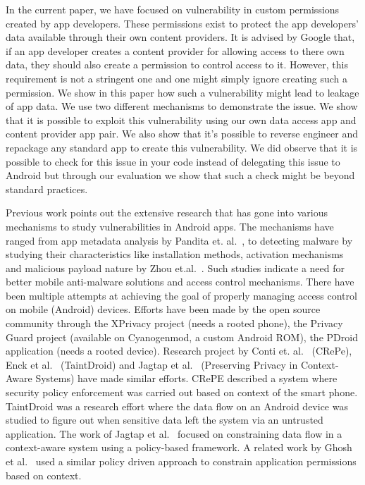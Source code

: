 In the current paper, we have focused on vulnerability in custom permissions created by app developers. These permissions exist to protect the app developers' data available through their own content providers. It is advised by Google that, if an app developer creates a content provider for allowing access to there own data, they should also create a permission to control access to it. However, this requirement is not a stringent one and one might simply ignore creating such a permission. We show in this paper how such a vulnerability might lead to leakage of app data. We use two different mechanisms to demonstrate the issue. We show that it is possible to exploit this vulnerability using our own data access app and content provider app pair. We also show that it's possible to reverse engineer and repackage any standard app to create this vulnerability. We did observe that it is possible to check for this issue in your code instead of delegating this issue to Android but through our evaluation we show that such a check might be beyond standard practices. 

Previous work points out the extensive research that has gone into various mechanisms to study vulnerabilities in Android apps. The mechanisms have ranged from app metadata analysis by Pandita et. al.~\cite{Pandita2013Whyper}, to detecting malware by studying their characteristics like installation methods, activation mechanisms and malicious payload nature by Zhou et.al.~\cite{Zhou2012MalwareGenomeProject}. Such studies indicate a need for better mobile anti-malware solutions and access control mechanisms. There have been multiple attempts at achieving the goal of properly managing access control on mobile (Android) devices. Efforts have been made by the open source community through the XPrivacy project (needs a rooted phone), the Privacy Guard project (available on Cyanogenmod, a custom Android ROM), the PDroid application (needs a rooted device). Research project by Conti et. al.~\cite{conti2011crepe} (CRePe), Enck et al.~\cite{enck2010taintdroid} (TaintDroid) and Jagtap et al.~\cite{Jagtap2011Privacy} (Preserving Privacy in Context-Aware Systems) have made similar efforts. CRePE described a system where security policy enforcement was carried out based on context of the smart phone. TaintDroid was a research effort where the data flow on an Android device was studied to figure out when sensitive data left the system via an untrusted application. The work of Jagtap et al.~\cite{Jagtap2011Privacy} focused on constraining data flow in a context-aware system using a policy-based framework. A related work by Ghosh et al.~\cite{ghosh2012privacy} used a similar policy driven approach to constrain application permissions based on context. 

